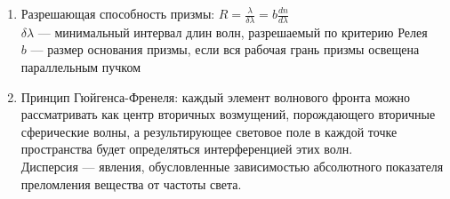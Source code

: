 \begin{enumerate}
    \item Разрешающая способность призмы: $R = \frac{\lambda}{\delta\lambda} = b \frac{dn}{d\lambda}$ \\
    $\delta\lambda$ --- минимальный интервал длин волн, разрешаемый по критерию Релея \\
    $b$ --- размер основания призмы, если вся рабочая грань призмы освещена параллельным пучком 
    
    \item Принцип Гюйгенса-Френеля:
    каждый элемент волнового фронта можно рассматривать как центр вторичных возмущений,
    порождающего вторичные сферические волны, а результирующее световое поле в каждой точке пространства
    будет определяться интерференцией этих волн. \\
    Дисперсия --- явления, обусловленные зависимостью абсолютного показателя преломления вещества от частоты света.
    
\end{enumerate}
